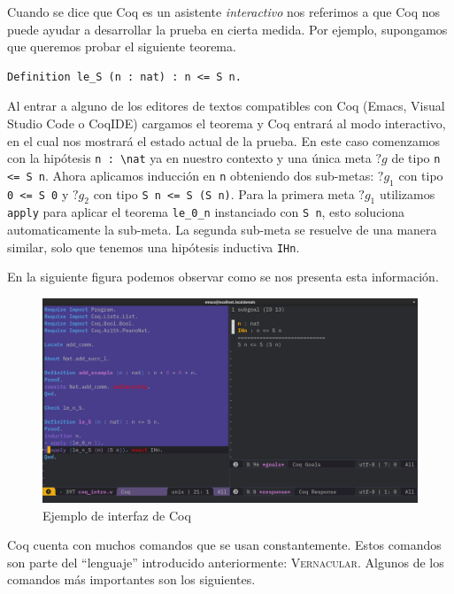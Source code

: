 Cuando se dice que Coq es un asistente \textit{interactivo} nos referimos a que Coq nos puede ayudar a desarrollar la prueba en cierta medida.
Por ejemplo, supongamos que queremos probar el siguiente teorema.

\begin{lstlisting}[frame=tb,caption={Teorema ejemplo},label=lst:le_S]
Definition le_S (n : nat) : n <= S n.
\end{lstlisting}

Al entrar a alguno de los editores de textos compatibles con Coq (Emacs, Visual Studio Code o CoqIDE) cargamos el teorema y Coq entrará al modo interactivo, en el cual nos mostrará el estado actual de la prueba.
En este caso comenzamos con la hipótesis \lstinline{n : \nat} ya en nuestro contexto y una única meta $?g$ de tipo \lstinline{n <= S n}.
Ahora aplicamos inducción en \lstinline{n} obteniendo dos sub-metas: $?g_1$ con tipo \lstinline{0 <= S 0} y $?g_2$ con tipo \lstinline{S n <= S (S n)}.
Para la primera meta $?g_1$ utilizamos \lstinline{apply} para aplicar el teorema \lstinline{le_0_n} instanciado con \lstinline{S n}, esto soluciona automaticamente la sub-meta.
La segunda sub-meta se resuelve de una manera similar, solo que tenemos una hipótesis inductiva \lstinline{IHn}.

En la siguiente figura podemos observar como se nos presenta esta información.

\begin{figure}[h]
  \centering
  \includegraphics[width=1\textwidth]{gfx/coq_emacs_example.png}
  \caption{Ejemplo de interfaz de Coq}
  \label{fig:ui}
\end{figure}

Coq cuenta con muchos comandos que se usan constantemente. Estos comandos son parte del ``lenguaje'' introducido anteriormente: \textsc{Vernacular}. Algunos de los comandos más importantes son los siguientes.

